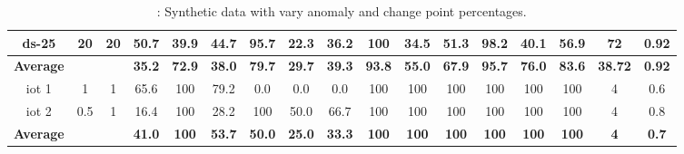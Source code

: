 \begin{table*}[h]
\begin{tabular}{|c|c|c|c|c|c|c|c|c|c|c|c|c|c|c|c|c|}
		\midrule
		ds-25 & 20    & 20    & 50.7  & 39.9  & 44.7  & 95.7  & 22.3  & 36.2  & 100 & 34.5  & 51.3  & 98.2  & 40.1  & 56.9  & 72    & 0.92 \\
		\midrule
		\rowcolor[rgb]{ 1,  1,  0} \textbf{Average} &       &       & \textbf{35.2} & \textbf{72.9} & \textbf{38.0} & \textbf{79.7} & \textbf{29.7} & \textbf{39.3} & \textbf{93.8} & \textbf{55.0} & \textbf{67.9} & \textbf{95.7} & \textbf{76.0} & \textbf{83.6} & \textbf{38.72} & \textbf{0.92} \\
		\midrule
		iot 1 & 1     & 1     & 65.6  & 100 & 79.2  & 0.0   & 0.0   & 0.0   & 100 & 100 & 100 & 100 & 100 & 100 & 4     & 0.6 \\
		\midrule
		iot 2 & 0.5   & 1     & 16.4  & 100 & 28.2  & 100 & 50.0  & 66.7  & 100 & 100 & 100 & 100 & 100 & 100 & 4     & 0.8 \\
		\midrule
		\rowcolor[rgb]{ 1,  1,  0} \textbf{Average} &       &       & \textbf{41.0} & \textbf{100} & \textbf{53.7} & \textbf{50.0} & \textbf{25.0} & \textbf{33.3} & \textbf{100} & \textbf{100} & \textbf{100} & \textbf{100} & \textbf{100} & \textbf{100} & \textbf{4} & \textbf{0.7} \\
		\bottomrule
	\end{tabular}%
		\caption{: Synthetic data with vary anomaly and change point percentages.}
\label{tab:gcz_data_synthetic}%
\end{table*}%


